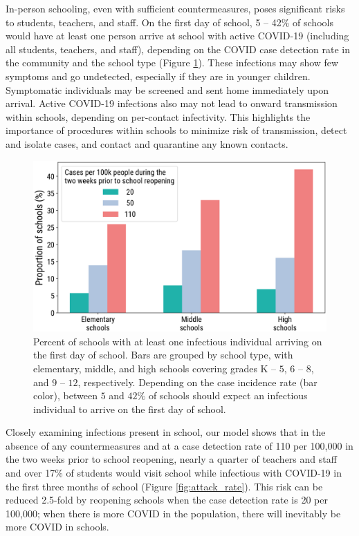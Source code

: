 \documentclass[9pt,twocolumn,twoside,lineno]{pnas-new}
\begin{document}
In-person schooling, even with sufficient countermeasures, poses significant risks to students, teachers, and staff. On the first day of school, 5 -- 42\% of schools would have at least one person arrive at school with active COVID-19 (including all students, teachers, and staff), depending on the COVID case detection rate in the community and the school type (Figure \ref{fig:schools_with_a_case}). These infections may show few symptoms and go undetected, especially if they are in younger children. Symptomatic individuals may be screened and sent home immediately upon arrival. Active COVID-19 infections also may not lead to onward transmission within schools, depending on per-contact infectivity. This highlights the importance of procedures within schools to minimize risk of transmission, detect and isolate cases, and contact and quarantine any known contacts. 

\begin{figure}[t] %
    \centering
    \includegraphics[width=0.9\linewidth]{schools_with_a_case_2020-08-05_trim_notitle.png}
    \caption{Percent of schools with at least one infectious individual arriving on the first day of school. Bars are grouped by school type, with elementary, middle, and high schools covering grades K -- $5$, $6$ -- $8$, and $9$ -- $12$, respectively. Depending on the case incidence rate (bar color), between $5$ and $42\%$ of schools should expect an infectious individual to arrive on the first day of school.}
    \label{fig:schools_with_a_case}
\end{figure}

Closely examining infections present in school, our model shows that in the absence of any countermeasures and at a case detection rate of 110 per 100,000 in the two weeks prior to school reopening, nearly a quarter of teachers and staff and over 17\% of students would visit school while infectious with COVID-19 in the first three months of school (Figure \ref{fig:attack_rate}). This risk can be reduced 2.5-fold by reopening schools when the case detection rate is 20 per 100,000; when there is more COVID in the population, there will inevitably be more COVID in schools. 
\end{document}
